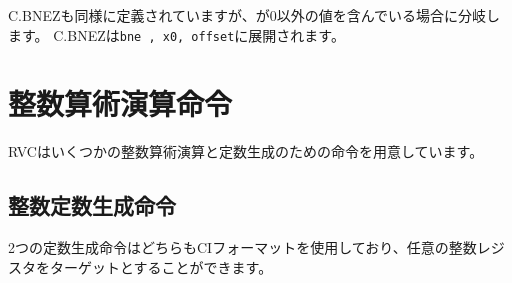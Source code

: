 \begin{comment}
C.BNEZ is defined analogously, but it takes the branch if {\em \rsoneprime} contains
a nonzero value.  It expands to {\tt bne \rsoneprime, x0, offset}.
\end{comment}
C.BNEZも同様に定義されていますが、{\em \rsoneprime}が0以外の値を含んでいる場合に分岐します。
C.BNEZは{\tt bne \rsoneprime, x0, offset}に展開されます。

\begin{comment}
\section{Integer Computational Instructions}
\end{comment}
\section{整数算術演算命令}

\begin{comment}
RVC provides several instructions for integer arithmetic and constant generation.
\end{comment}
RVCはいくつかの整数算術演算と定数生成のための命令を用意しています。

\begin{comment}
\subsection*{Integer Constant-Generation Instructions}
\end{comment}
\subsection*{整数定数生成命令}

\begin{comment}
The two constant-generation instructions both use the CI instruction
format and can target any integer register.
\end{comment}
2つの定数生成命令はどちらもCIフォーマットを使用しており、任意の整数レジスタをターゲットとすることができます。

